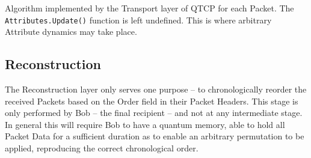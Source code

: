 \documentclass[aps,rmp,twocolumn,amsmath,amssymb,nofootinbib,superscriptaddress,longbibliography,floatfix]{revtex4-1}
\begin{document}
\begin{table}[!htb]
\caption{Algorithm implemented by the {\sc Transport} layer of QTCP for each {\sc Packet}. The {\tt Attributes.Update()} function is left undefined. This is where arbitrary {\sc Attribute} dynamics may take place.} \label{tab:transport_alg}
\end{table}

%
%

\subsection{Reconstruction}

The {\sc Reconstruction} layer only serves one purpose -- to chronologically reorder the received {\sc Packets} based on the {\sc Order} field in their {\sc Packet Headers}. This stage is only performed by Bob -- the final recipient -- and not at any intermediate stage. In general this will require Bob to have a quantum memory, able to hold all {\sc Packet Data} for a sufficient duration as to enable an arbitrary permutation to be applied, reproducing the correct chronological order.
\end{document}
